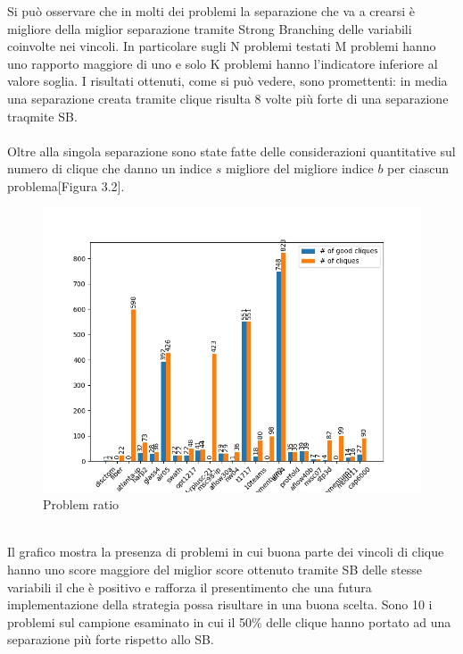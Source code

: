 \documentclass[12pt,a4paper,twoside,openright]{book}
\begin{document}
Si può osservare che in molti dei problemi la separazione che va a crearsi è migliore della miglior separazione 
tramite Strong Branching delle variabili coinvolte nei vincoli. In particolare sugli N problemi testati
M problemi hanno uno rapporto maggiore di uno e solo K problemi hanno l'indicatore inferiore al valore soglia.
I risultati ottenuti, come si può vedere, sono promettenti: in media una separazione creata tramite clique risulta
8 volte più forte di una separazione traqmite SB. \\\\
Oltre alla singola separazione sono state fatte delle considerazioni quantitative sul numero di clique che danno un 
indice $s$ migliore del migliore indice $b$ per ciascun problema[Figura 3.2].
\begin{figure}[ht]
    \centering
    \includegraphics [scale = 0.65]{chart_agg2}
    \caption{Problem ratio}
    \label{fig:ratio}
\end{figure}\\
Il grafico mostra la presenza di problemi in cui buona parte dei vincoli di clique hanno uno score maggiore del miglior
score ottenuto tramite SB delle stesse variabili il che è positivo e rafforza il presentimento che una futura implementazione
della strategia possa risultare in una buona scelta. Sono 10 i problemi sul campione esaminato in cui il 50\% delle clique
hanno portato ad una separazione più forte rispetto allo SB.
\end{document}
